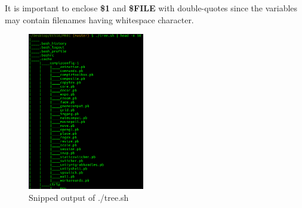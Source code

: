 \documentclass[12pt,a4paper]{article}
\begin{document}
\begin{enumerate}
It is important to enclose \textbf{\$1} and \textbf{\$FILE} with double-quotes since the variables may contain filenames having whitespace character.
\end{enumerate}

\begin{figure}[!h]
	\centering
	\includegraphics[width=2in]{./task01/task01_output.png}
	\caption{Snipped output of ./tree.sh}
\end{figure}
\end{document}
